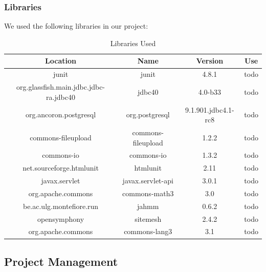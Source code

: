 \documentclass[11pt]{article}
\begin{document}
\subsubsection{Libraries}
We used the following libraries in our project:

\begin{table}[htdp]
\caption{Libraries Used}
\begin{center}
\begin{tabular}{|c|c|c|c|}
Location & Name & Version & Use \\
\hline
junit                                   & junit               & 4.8.1               & todo \\
org.glassfish.main.jdbc.jdbc-ra.jdbc40  & jdbc40              & 4.0-b33             & todo \\
org.ancoron.postgresql                  & org.postgresql      & 9.1.901.jdbc4.1-rc8 & todo \\
commons-fileupload                      & commons-fileupload  & 1.2.2               & todo \\
commons-io                              & commons-io          & 1.3.2               & todo \\
net.sourceforge.htmlunit                & htmlunit            & 2.11                & todo \\
javax.servlet                           & javax.servlet-api   & 3.0.1               & todo \\
org.apache.commons                      & commons-math3       & 3.0                 & todo \\
be.ac.ulg.montefiore.run                & jahmm               & 0.6.2               & todo \\
opensymphony                            & sitemesh            & 2.4.2               & todo \\ 
org.apache.commons                      & commons-lang3       & 3.1                 & todo 

\end{tabular}
\end{center}
\label{libs}
\end{table}

\subsection{Project Management}
\end{document}
